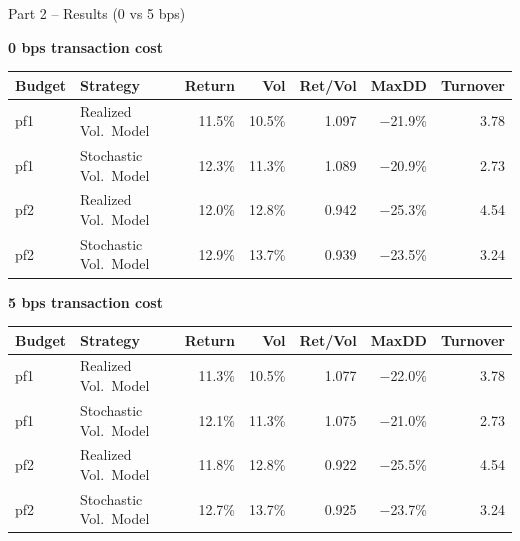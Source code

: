 \documentclass[10pt]{beamer}\usepackage[]{graphicx}\usepackage[table]{xcolor}
\begin{document}
\begin{frame}{Part 2 -- Results (0 vs 5 bps)}

  {\scriptsize \textbf{0 bps transaction cost}}

  \vspace{0.2em}
  {\scriptsize
  \setlength{\tabcolsep}{4pt}
  \begin{tabular}{@{}llrrrrr@{}}
    \toprule
    \textbf{Budget} & \textbf{Strategy} & \textbf{Return} & \textbf{Vol} & \textbf{Ret/Vol} & \textbf{MaxDD} & \textbf{Turnover} \\
    \midrule
    pf1 & Realized Vol.\ Model   & 11.5\% & 10.5\% & 1.097 & $-$21.9\% & 3.78 \\
    pf1 & Stochastic Vol.\ Model & 12.3\% & 11.3\% & 1.089 & $-$20.9\% & 2.73 \\
    pf2 & Realized Vol.\ Model   & 12.0\% & 12.8\% & 0.942 & $-$25.3\% & 4.54 \\
    pf2 & Stochastic Vol.\ Model & 12.9\% & 13.7\% & 0.939 & $-$23.5\% & 3.24 \\
    \bottomrule
  \end{tabular}
  }

  \vspace{0.55em}
  {\scriptsize \textbf{5 bps transaction cost}}

  \vspace{0.2em}
  {\scriptsize
  \setlength{\tabcolsep}{4pt}
  \begin{tabular}{@{}llrrrrr@{}}
    \toprule
    \textbf{Budget} & \textbf{Strategy} & \textbf{Return} & \textbf{Vol} & \textbf{Ret/Vol} & \textbf{MaxDD} & \textbf{Turnover} \\
    \midrule
    pf1 & Realized Vol.\ Model   & 11.3\% & 10.5\% & 1.077 & $-$22.0\% & 3.78 \\
    pf1 & Stochastic Vol.\ Model & 12.1\% & 11.3\% & 1.075 & $-$21.0\% & 2.73 \\
    pf2 & Realized Vol.\ Model   & 11.8\% & 12.8\% & 0.922 & $-$25.5\% & 4.54 \\
    pf2 & Stochastic Vol.\ Model & 12.7\% & 13.7\% & 0.925 & $-$23.7\% & 3.24 \\
    \bottomrule
  \end{tabular}
  }

\end{frame}

\end{document}
